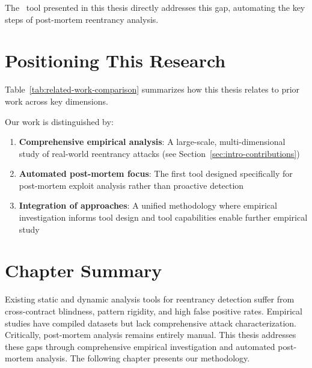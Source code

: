 The \ToolName\ tool presented in this thesis directly addresses this gap, automating the key steps of post-mortem reentrancy analysis.

\section{Positioning This Research}
\label{sec:rw-positioning}

Table~\ref{tab:related-work-comparison} summarizes how this thesis relates to prior work across key dimensions.



Our work is distinguished by:
\begin{enumerate}
    \item \textbf{Comprehensive empirical analysis}: A large-scale, multi-dimensional study of real-world reentrancy attacks (see Section~\ref{sec:intro-contributions})
    \item \textbf{Automated post-mortem focus}: The first tool designed specifically for post-mortem exploit analysis rather than proactive detection
    \item \textbf{Integration of approaches}: A unified methodology where empirical investigation informs tool design and tool capabilities enable further empirical study
\end{enumerate}

\section{Chapter Summary}
\label{sec:rw-summary}

Existing static and dynamic analysis tools for reentrancy detection suffer from cross-contract blindness, pattern rigidity, and high false positive rates. Empirical studies have compiled datasets but lack comprehensive attack characterization. Critically, post-mortem analysis remains entirely manual. This thesis addresses these gaps through comprehensive empirical investigation and automated post-mortem analysis. The following chapter presents our methodology.
